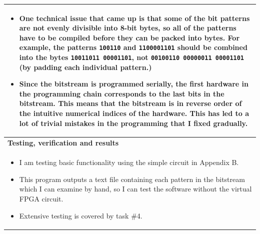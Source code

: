 \documentclass[12pt,letterpaper]{article}
\begin{document}
\begin{tabular}{|p{6.4in}|}
\begin{itemize}
\item One technical issue that came up is that some of the bit patterns are not evenly divisible into 8-bit bytes, so all of the patterns have to be compiled before they can be packed into bytes. For example, the patterns \texttt{100110} and \texttt{1100001101} should be combined into the bytes \texttt{10011011 00001101}, not \texttt{00100110 00000011 00001101} (by padding each individual pattern.)
\item Since the bitstream is programmed serially, the first hardware in the programming chain corresponds to the last bits in the bitstream.  This means that the bitstream is in reverse order of the intuitive numerical indices of the hardware.  This has led to a lot of trivial mistakes in the programming that I fixed gradually.
\end{itemize} 
\vspace{-1em} \\
\hline
\textbf{Testing, verification and results} \\
\vspace{-1em}
\begin{itemize}
\item I am testing basic functionality using the simple circuit in Appendix B.
\item This program outputs a text file containing each pattern in the bitstream which I can examine by hand, so I can test the software without the virtual FPGA circuit.
\item Extensive testing is covered by task \#4.
\end{itemize} 
\vspace{-1em} \\
\hline
\end{tabular}
\end{document}
